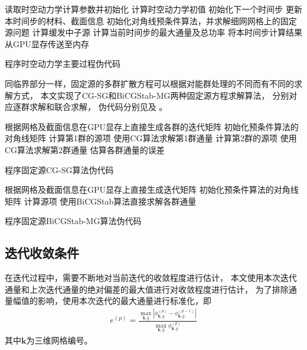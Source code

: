 \begin{algorithm}
读取时空动力学计算参数并初始化\;
计算时空动力学初值
\;
{
  初始化下一个时间步\;
  更新本时间步的材料、截面信息\;
    初始化对角线预条件算法，并求解细网网格上的固定源问题\;
  计算缓发中子源 \algoend
  计算当前时间步的最大通量及总功率\;
  将本时间步计算结果从GPU显存传送至内存\;
}

\caption{\label{alg:program.kinetics.loop}
\ProgramName 程序时空动力学主要过程伪代码}
\end{algorithm}

同临界部分一样，固定源的多群扩散方程可以根据对能群处理的不同而有不同的求解方式，
本文实现了CG-SG和BiCGStab-MG两种固定源方程求解算法，
分别对应逐群求解和联合求解，
伪代码分别见及%
。

\begin{algorithm}
根据网格及截面信息在GPU显存上直接生成各群的迭代矩阵\;
初始化预条件算法的对角线矩阵\;
{
  计算第1群的源项 \algoend
  使用CG算法求解第1群通量\;
  计算第2群的源项 \algoend
  使用CG算法求解第2群通量\;
  估算各群通量的误差\;
}
\caption{\label{alg:program.kinetics.cg-sg}
\ProgramName 程序固定源CG-SG算法伪代码}
\end{algorithm}


\begin{algorithm}
根据网格及截面信息在GPU显存上直接生成迭代矩阵\;
初始化预条件算法的对角线矩阵\;
计算源项\;
使用BiCGStab算法直接求解各群通量\;
\caption{\label{alg:program.kinetics.bicgstab-mg}
\ProgramName 程序固定源BiCGStab-MG算法伪代码}
\end{algorithm}


\subsection{迭代收敛条件}

在迭代过程中，需要不断地对当前迭代的收敛程度进行估计，
本文使用本次迭代通量和上次迭代通量的绝对偏差的最大值进行对收敛程度进行估计，
为了排除通量幅值的影响，使用本次迭代的最大通量进行标准化，即
\begin{align}
e^{(p)}=\frac{\displaystyle \max_{\bm{k},g}\left|\phi_{\bm{k},g}^{(p)}-\phi_{\bm{k},g}^{(p-1)}\right|}
         {\displaystyle \max_{\bm{k},g}\phi_{\bm{k},g}^{(p)}}
\end{align}
其中$\bm{k}$为三维网格编号。


